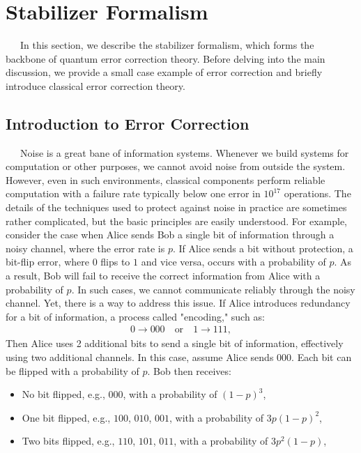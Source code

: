 \documentclass[a4paper,11pt]{ltjsarticle}
\begin{document}
\section{Stabilizer Formalism }{
    \ \ \ In this section, we describe the stabilizer formalism\cite{nielsen2010}, which forms the backbone of quantum error correction theory. Before delving into the main discussion, we provide a small case example of error correction and briefly introduce classical error correction theory.
    \subsection{Introduction to Error Correction}\label{introduction_to_error_correction}{
        \ \ \ Noise is a great bane of information systems. Whenever we build systems for computation or other purposes, we cannot avoid noise from outside the system. However, even in such environments, classical components perform reliable computation with a failure rate typically below one error in $10^{17}$ operations. The details of the techniques used to protect against noise in practice are sometimes rather complicated, but the basic principles are easily understood. For example, consider the case when Alice sends Bob a single bit of information through a noisy channel, where the error rate is $p$. If Alice sends a bit without protection, a bit-flip error, where $0$ flips to $1$ and vice versa, occurs with a probability of $p$. As a result, Bob will fail to receive the correct information from Alice with a probability of $p$. In such cases, we cannot communicate reliably through the noisy channel. Yet, there is a way to address this issue. If Alice introduces redundancy for a bit of information, a process called "encoding," such as:
        \begin{align}
            0 \rightarrow 000 \quad \text{or} \quad 1 \rightarrow 111,
        \end{align}      
        Then Alice uses 2 additional bits to send a single bit of information, effectively using two additional channels. In this case, assume Alice sends $000$. Each bit can be flipped with a probability of $p$. Bob then receives:
        \begin{itemize}
            \item No bit flipped, e.g., $000$, with a probability of $(1-p)^3$,
            \item One bit flipped, e.g., $100$, $010$, $001$, with a probability of $3p(1-p)^2$,
            \item Two bits flipped, e.g., $110$, $101$, $011$, with a probability of $3p^2(1-p)$,

\end{itemize}}}
\end{document}
